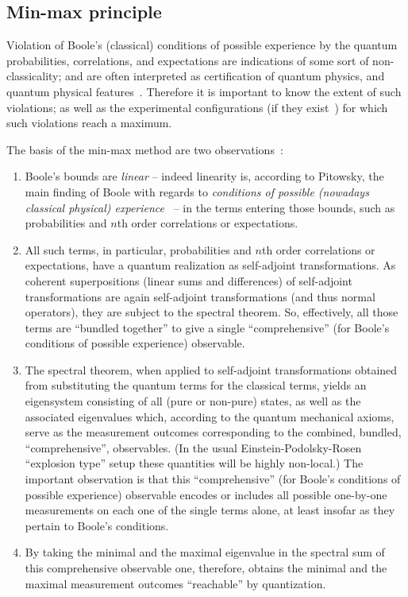 \subsection{Min-max principle}

Violation of  Boole's
(classical) conditions of possible experience
by the quantum probabilities, correlations, and expectations
are indications of some sort of non-classicality;
and are often interpreted as certification of
quantum physics, and quantum physical features~\cite{belrand2010,Um-2013}.
Therefore it is important to know the extent of such violations; as well as the experimental configurations
(if they exist~\cite{specker57})
for which such violations reach a maximum.

The basis of the min-max method are two observations~\cite{filipp-svo-04-qpoly-prl}:
\begin{enumerate}
\item
Boole's bounds  are {\em linear}  -- indeed linearity is, according to Pitowsky\cite{Pit-94},
the main finding of Boole with regards to {\em conditions of possible (nowadays classical physical) experience}~\cite{Boole,Boole-62}  --
in the terms entering those bounds, such as probabilities and $n$th order correlations or expectations.
\item
All such terms, in particular, probabilities and $n$th order correlations or expectations,
have a quantum realization as self-adjoint transformations. As coherent superpositions (linear sums and differences) of self-adjoint transformations are again self-adjoint transformations (and thus normal operators), they are subject to the spectral theorem. So, effectively, all those terms are ``bundled together'' to give a single ``comprehensive'' (for Boole's conditions of possible experience) observable.
\item
The spectral theorem, when applied to self-adjoint transformations obtained from substituting the quantum terms for the classical terms, yields an eigensystem consisting of all (pure or non-pure) states, as well as the associated eigenvalues which,
according to the quantum mechanical axioms,  serve as the measurement outcomes corresponding to the combined, bundled, ``comprehensive'', observables. (In the usual Einstein-Podolsky-Rosen ``explosion type'' setup these quantities will be highly non-local.) The important observation is that this ``comprehensive'' (for Boole's conditions of possible experience) observable encodes or includes all possible one-by-one measurements on each one of the single terms alone,
at least insofar as they pertain to Boole's conditions.
\item
By taking the minimal and the maximal eigenvalue in the spectral sum of this comprehensive observable one, therefore, obtains the minimal and the maximal measurement outcomes ``reachable'' by quantization.
\end{enumerate}

